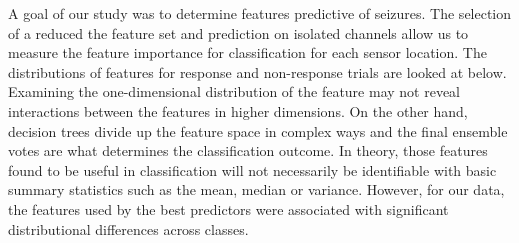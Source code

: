 
 
A goal of our study was to determine features  
predictive of seizures. The selection of a reduced
the feature set and prediction on isolated channels
allow us to measure the feature importance for 
classification for each sensor location.
The distributions of features for response and non-response trials are looked
at below. Examining the one-dimensional distribution of the feature may not reveal interactions between the features in higher dimensions. 
On the other hand, decision trees divide up the feature space in complex ways and the final ensemble votes are what determines the classification outcome. 
In theory, those features found to be useful in classification will not necessarily be identifiable with basic summary statistics such as the mean, median or variance. However, for our data, the features used by the best predictors were associated with significant distributional differences across classes.

